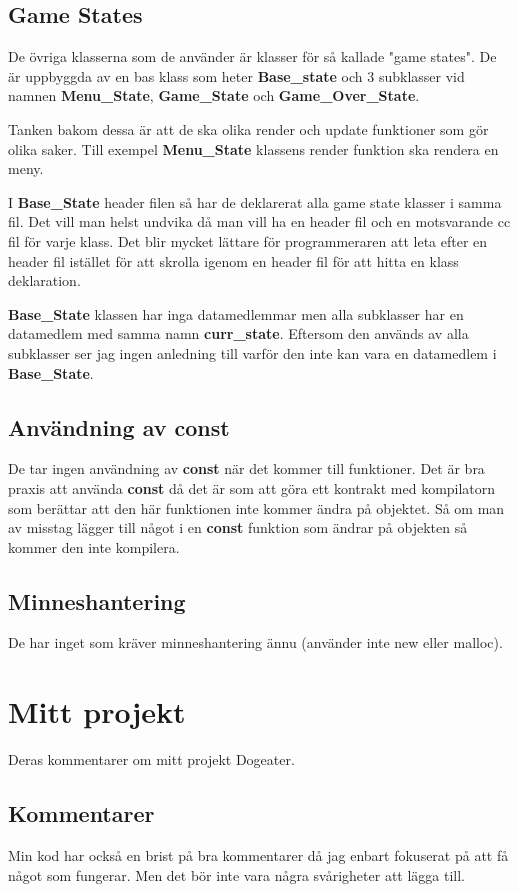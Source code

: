 \documentclass{TDP003mall}
\begin{document}
\subsection{Game States}
De övriga klasserna som de använder är klasser för så kallade "game states".
De är uppbyggda av en bas klass som heter \textbf{Base\_state} och 3 subklasser vid namnen 
\textbf{Menu\_State}, \textbf{Game\_State} och \textbf{Game\_Over\_State}. 

Tanken bakom dessa är att de ska olika render och update funktioner som gör olika saker.
Till exempel \textbf{Menu\_State} klassens render funktion ska rendera en meny.

I \textbf{Base\_State} header filen så har de deklarerat alla game state klasser i samma fil.
Det vill man helst undvika då man vill ha en header fil och en motsvarande cc fil för varje klass.
Det blir mycket lättare för programmeraren att leta efter en header fil istället för att skrolla igenom en header fil för att hitta en klass deklaration.

\textbf{Base\_State} klassen har inga datamedlemmar men alla subklasser har en datamedlem med samma namn
\textbf{curr\_state}. Eftersom den används av alla subklasser ser jag ingen anledning till varför den inte kan vara 
en datamedlem i \textbf{Base\_State}.

\subsection{Användning av const}
De tar ingen användning av \textbf{const} när det kommer till funktioner.
Det är bra praxis att använda \textbf{const} då det är som att göra ett kontrakt med kompilatorn som berättar att den här funktionen inte kommer ändra på objektet.
Så om man av misstag lägger till något i en \textbf{const} funktion som ändrar på objekten så kommer den inte kompilera.

\subsection{Minneshantering}
De har inget som kräver minneshantering ännu (använder inte new eller malloc).

\section{Mitt projekt}
Deras kommentarer om mitt projekt Dogeater.

\subsection{Kommentarer}
Min kod har också en brist på bra kommentarer då jag enbart fokuserat på att få något som fungerar.
Men det bör inte vara några svårigheter att lägga till.
\end{document}
